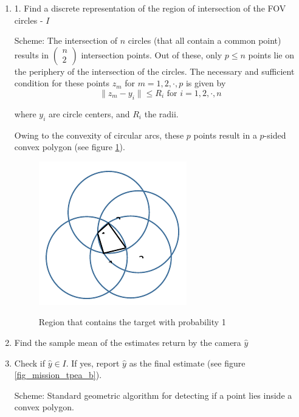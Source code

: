 \begin{enumerate}
\item 
1. Find a discrete representation of the region of intersection of the FOV circles - $I$

Scheme:
The intersection of $n$ circles (that all contain a common point) results in $\left( \begin{array}{c} n  \\ 2 \end{array} \right)$ intersection points. Out of these, only $p \leq n$ points lie on the periphery of the intersection of the circles. The necessary and sufficient condition for these points $z_m$ for $m = 1,2, \cdot , p$ is given by
\[ \|z_m - y_i\| \leq R_i \textrm{ for } i=1,2,\cdot,n  \]

where $y_i$ are circle centers, and $R_i$ the radii.

Owing to the convexity of circular arcs, these $p$ points 
result in a $p$-sided convex polygon (see figure \ref{fig_mission_tpea_a}).

\begin{figure}
\centering
\includegraphics[scale=1]{Figures/mission_tpea_a}
\label{fig_mission_tpea_a}
\caption{Region that contains the target with probability 1}
\end{figure}

\item  Find the sample mean of the estimates return by the camera $\hat{y}$

\item  Check if $\hat{y} \in I$. If yes, report $\hat{y}$ as the final estimate (see figure \ref{fig_mission_tpea_b}).

Scheme:
Standard geometric algorithm for detecting if a point lies
inside a convex polygon. 


\end{enumerate}
